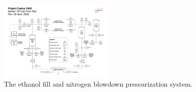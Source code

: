 \documentclass[9pt]{article} %
\numberwithin{equation}{section} %
\begin{document}
\begin{figure}[!htb] 
    \centering
    \includegraphics[scale=0.5, width=0.5\textwidth, trim={0cm 9.85cm 23.5cm 4.5cm}, clip]{Aphlex1B_04-02-2020_P&ID.pdf} %
    \caption{The ethanol fill and nitrogen blowdown pressurization system.}
    \label{fig:ethanol_fill_and_pressurization_system}
\end{figure}
\end{document}

